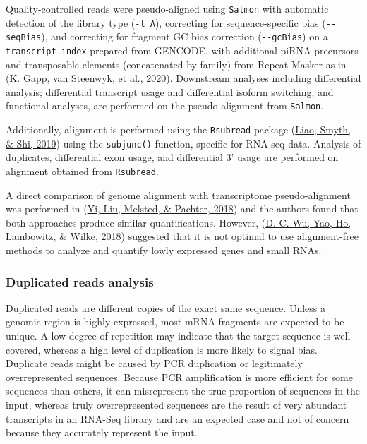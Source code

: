 \documentclass[12pt,twoside]{reedthesis}
\begin{document}
Quality-controlled reads were pseudo-aligned using \texttt{Salmon} with
automatic detection of the library type (\texttt{-l\ A}), correcting for
sequence-specific bias (\texttt{-\/-seqBias}), and correcting for fragment GC
bias correction (\texttt{-\/-gcBias}) on a \texttt{transcript\ index} prepared from
GENCODE, with additional piRNA precursors and transposable elements
(concatenated by family) from Repeat Masker as in (\protect\hyperlink{ref-gapp2020}{K. Gapp, van Steenwyk, et al., 2020}).
Downstream analyses including differential analysis; differential
transcript usage and differential isoform switching; and functional
analyses, are performed on the pseudo-alignment from \texttt{Salmon}.

Additionally, alignment is performed using the \texttt{Rsubread} package
(\protect\hyperlink{ref-liao2019}{Liao, Smyth, \& Shi, 2019}) using the \texttt{subjunc()} function, specific for RNA-seq data.
Analysis of duplicates, differential exon usage, and differential 3'
usage are performed on alignment obtained from \texttt{Rsubread}.

A direct comparison of genome alignment with transcriptome
pseudo-alignment was performed in (\protect\hyperlink{ref-yi2018}{Yi, Liu, Melsted, \& Pachter, 2018}) and the authors found that
both approaches produce similar quantifications. However, (\protect\hyperlink{ref-wu2018}{D. C. Wu, Yao, Ho, Lambowitz, \& Wilke, 2018})
suggested that it is not optimal to use alignment-free methods to
analyze and quantify lowly expressed genes and small RNAs.

\hypertarget{m3.2.2}{%
\subsubsection*{Duplicated reads analysis}\label{m3.2.2}}

Duplicated reads are different copies of the exact same sequence. Unless
a genomic region is highly expressed, most mRNA fragments are expected
to be unique. A low degree of repetition may indicate that the target
sequence is well-covered, whereas a high level of duplication is more
likely to signal bias. Duplicate reads might be caused by PCR
duplication or legitimately overrepresented sequences. Because PCR
amplification is more efficient for some sequences than others, it can
misrepresent the true proportion of sequences in the input, whereas
truly overrepresented sequences are the result of very abundant
transcripts in an RNA-Seq library and are an expected case and not of
concern because they accurately represent the input.
\end{document}
